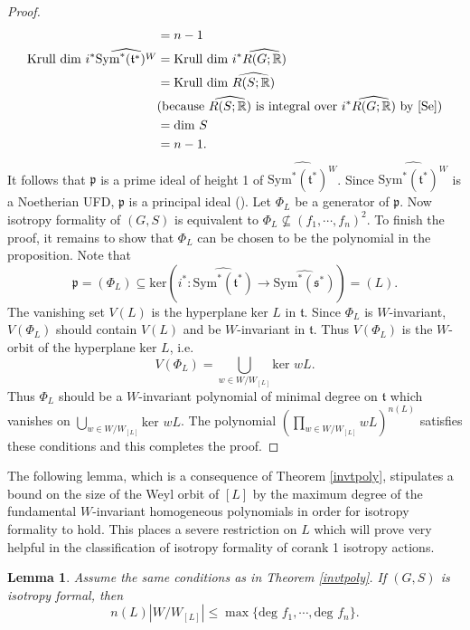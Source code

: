 \documentclass[11pt]{amsart}
\theoremstyle{plain}
\newtheorem{lemma}[theorem]{Lemma}
\theoremstyle{definition}
\begin{document}
\begin{proof}
\begin{align*}
												&=n-1\\
		\text{Krull dim }i^*\widehat{\text{Sym}^*(\mathfrak{t}^*)^W}&=\text{Krull dim }i^*\widehat{R(G; \mathbb{R})}\\
													&=\text{Krull dim }\widehat{R(S; \mathbb{R})}\\
													&(\text{because }\widehat{R(S; \mathbb{R})}\text{ is integral over }i^*\widehat{R(G; \mathbb{R})}\text{ by \cite[Proposition 3.2]{Se}})\\
													&=\text{dim }S\\
													&=n-1.
	\end{align*}
	It follows that $\mathfrak{p}$ is a prime ideal of height 1 of $\widehat{\text{Sym}^*(\mathfrak{t}^*)^W}$. Since $\widehat{\text{Sym}^*(\mathfrak{t}^*)^W}$ is a Noetherian UFD, $\mathfrak{p}$ is a principal ideal (\cite[Lemma 10.120.6]{SP}). Let $\Phi_L$ be a generator of $\mathfrak{p}$. Now isotropy formality of $(G, S)$ is equivalent to $\Phi_L\nsubseteq (f_1, \cdots, f_n)^2$. To finish the proof, it remains to show that $\Phi_L$ can be chosen to be the polynomial in the proposition. Note that 
	\[\mathfrak{p}=(\Phi_L)\subseteq \text{ker}(i^*: \widehat{\text{Sym}^*(\mathfrak{t}^*)}\to \widehat{\text{Sym}^*(\mathfrak{s}^*)})=(L).\]
	The vanishing set $V(L)$ is the hyperplane $\text{ker }L$ in $\mathfrak{t}$. Since $\Phi_L$ is $W$-invariant, $V(\Phi_L)$ should contain $V(L)$ and be $W$-invariant in $\mathfrak{t}$. Thus $V(\Phi_L)$ is the $W$-orbit of the hyperplane $\text{ker }L$, i.e. 
	\[V(\Phi_L)=\bigcup_{w\in W/W_{[L]}}\text{ker }wL.\]
	Thus $\Phi_L$ should be a $W$-invariant polynomial of minimal degree on $\mathfrak{t}$ which vanishes on $\displaystyle \bigcup_{w\in W/W_{[L]}}\text{ker }wL$. The polynomial $\displaystyle \left(\prod_{w\in W/W_{[L]}} wL\right)^{n(L)}$ satisfies these conditions and this completes the proof.
\end{proof}
The following lemma, which is a consequence of Theorem \ref{invtpoly}, stipulates a bound on the size of the Weyl orbit of $[L]$ by the maximum degree of the fundamental $W$-invariant homogeneous polynomials in order for isotropy formality to hold. This places a severe restriction on $L$ which will prove very helpful in the classification of isotropy formality of corank 1 isotropy actions. 
\begin{lemma}\label{degreebound}
	Assume the same conditions as in Theorem \ref{invtpoly}. If $(G, S)$ is isotropy formal, then 
	\[n(L)|W/W_{[L]}|\leq \max\{\text{deg }f_1, \cdots, \text{deg }f_n\}.\]
\end{lemma}
\end{document}
